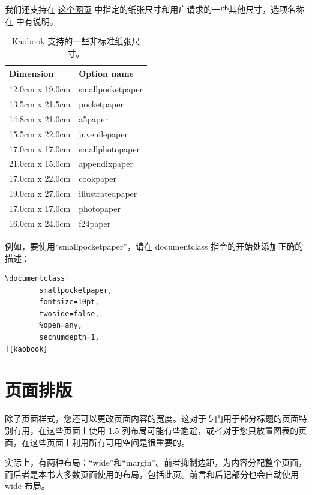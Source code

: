 我们还支持在 \href{https://www.bod.de/hilfe/hilfe-und-service.html?cmd=SINGLE\&entryID=2494\_GER\_WSS\&eo=2\&title=welche-buchformate-gibt-es}{这个网页} 中指定的纸张尺寸和用户请求的一些其他尺寸，选项名称在  中有说明。

\begin{table}[h!]
	\caption{Kaobook 支持的一些非标准纸张尺寸。}
	\begin{tabular}{ll}
		\toprule
		Dimension & Option name \\
		\midrule
		12.0cm x 19.0cm & smallpocketpaper \\
		13.5cm x 21.5cm & pocketpaper \\
		14.8cm x 21.0cm & a5paper \\
		15.5cm x 22.0cm & juvenilepaper \\
		17.0cm x 17.0cm & smallphotopaper \\
		21.0cm x 15.0cm & appendixpaper \\
		17.0cm x 22.0cm & cookpaper \\
		19.0cm x 27.0cm & illustratedpaper \\
		17.0cm x 17.0cm & photopaper \\
		16.0cm x 24.0cm & f24paper \\
		\bottomrule
	\end{tabular}
\end{table}

例如，要使用“smallpocketpaper”，请在 documentclass 指令的开始处添加正确的描述：

\begin{lstlisting}
\documentclass[
		smallpocketpaper,
		fontsize=10pt,
		twoside=false,
		%open=any,
		secnumdepth=1,
]{kaobook}
\end{lstlisting}

\section{页面排版}

除了页面样式，您还可以更改页面内容的宽度。这对于专门用于部分标题的页面特别有用，在这些页面上使用 1.5 列布局可能有些尴尬，或者对于您只放置图表的页面，在这些页面上利用所有可用空间是很重要的。

实际上，有两种布局：“wide”和“margin”。前者抑制边距，为内容分配整个页面，而后者是本书大多数页面使用的布局，包括此页。前言和后记部分也会自动使用 wide 布局。


